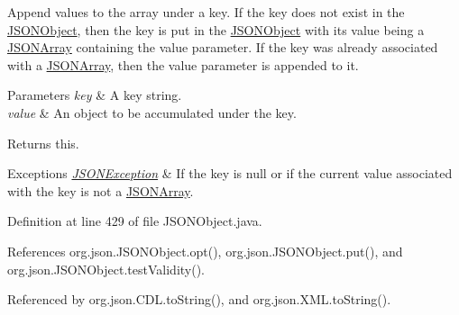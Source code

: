 Append values to the array under a key. If the key does not exist in the \hyperlink{classorg_1_1json_1_1_j_s_o_n_object}{J\-S\-O\-N\-Object}, then the key is put in the \hyperlink{classorg_1_1json_1_1_j_s_o_n_object}{J\-S\-O\-N\-Object} with its value being a \hyperlink{classorg_1_1json_1_1_j_s_o_n_array}{J\-S\-O\-N\-Array} containing the value parameter. If the key was already associated with a \hyperlink{classorg_1_1json_1_1_j_s_o_n_array}{J\-S\-O\-N\-Array}, then the value parameter is appended to it.


\begin{DoxyParams}{Parameters}
{\em key} & A key string. \\
\hline
{\em value} & An object to be accumulated under the key. \\
\hline
\end{DoxyParams}
\begin{DoxyReturn}{Returns}
this. 
\end{DoxyReturn}

\begin{DoxyExceptions}{Exceptions}
{\em \hyperlink{classorg_1_1json_1_1_j_s_o_n_exception}{J\-S\-O\-N\-Exception}} & If the key is null or if the current value associated with the key is not a \hyperlink{classorg_1_1json_1_1_j_s_o_n_array}{J\-S\-O\-N\-Array}. \\
\hline
\end{DoxyExceptions}


Definition at line 429 of file J\-S\-O\-N\-Object.\-java.



References org.\-json.\-J\-S\-O\-N\-Object.\-opt(), org.\-json.\-J\-S\-O\-N\-Object.\-put(), and org.\-json.\-J\-S\-O\-N\-Object.\-test\-Validity().



Referenced by org.\-json.\-C\-D\-L.\-to\-String(), and org.\-json.\-X\-M\-L.\-to\-String().


